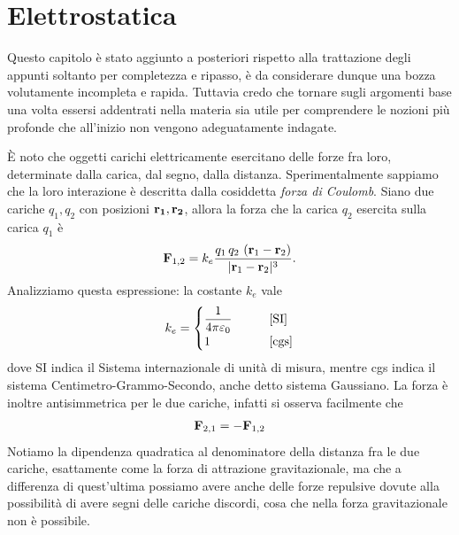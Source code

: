 \def \titolo {Appunti di Fisica 2}



\frontmatter
\maketitle
\tableofcontents
\cleardoublepage
\markboth{}{}
\mainmatter



\chapter{Elettrostatica}
Questo capitolo è stato aggiunto a posteriori rispetto alla trattazione degli appunti soltanto per completezza e ripasso, è da considerare dunque una bozza 
volutamente incompleta e rapida. Tuttavia credo che tornare sugli argomenti base una volta essersi addentrati nella materia sia utile per comprendere le 
nozioni più profonde che all'inizio non vengono adeguatamente indagate.

È noto che oggetti carichi elettricamente esercitano delle forze fra loro, determinate dalla carica, dal segno, dalla distanza. Sperimentalmente sappiamo 
che la loro interazione è descritta dalla cosiddetta \textit{forza di Coulomb}. Siano due cariche $ q_1, q_2 $ con posizioni $ \mathbf{r_1}, \mathbf{r_2} $, allora 
la forza che la carica $ q_2 $ esercita sulla carica $ q_1 $ è 
\begin{align}
  \mathbf{F}_{1,2} = k_e \frac{q_1 \, q_2 \, \left( \mathbf{r}_1 - \mathbf{r}_2 \right)}{|\mathbf{r}_1 - \mathbf{r}_2|^3}.
\end{align}
Analizziamo questa espressione: la costante $ k_e $ vale 
\begin{align*}
  k_e = 
  \begin{cases}
    \displaystyle \frac1{4\pi \varepsilon_0} \qquad & \textnormal{[SI]} \\
    1 \qquad & \textnormal{[cgs]}
  \end{cases}
\end{align*}
dove SI indica il Sistema internazionale di unità di misura, mentre cgs indica il sistema Centimetro-Grammo-Secondo, anche detto sistema Gaussiano. La 
forza è inoltre antisimmetrica per le due cariche, infatti si osserva facilmente che 
\begin{align}
  \mathbf{F}_{2,1} = - \mathbf{F}_{1,2}
\end{align}
Notiamo la dipendenza quadratica al denominatore della distanza fra le due cariche, esattamente come la forza di attrazione gravitazionale, ma che a 
differenza di quest'ultima possiamo avere anche delle forze repulsive dovute alla possibilità di avere segni delle cariche discordi, cosa che nella forza 
gravitazionale non è possibile.

